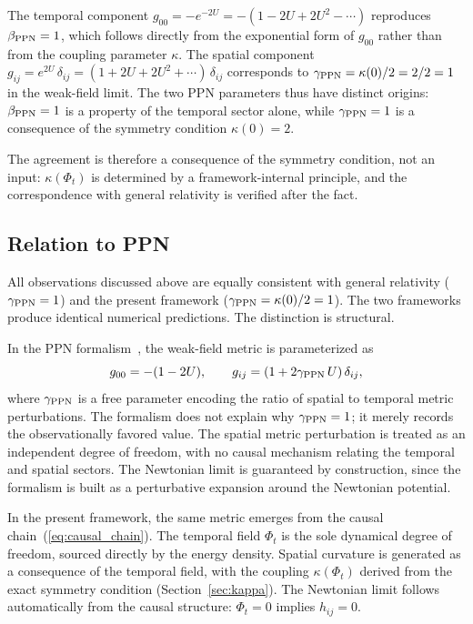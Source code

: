 \documentclass[12pt]{article}
\begin{document}
The temporal component $g_{00} = -e^{-2U} = -(1-2U+2U^2-\cdots)$ reproduces $\beta_{\rm PPN} = 1$, which follows directly from the exponential form of $g_{00}$ rather than from the coupling parameter $\kappa$. The spatial component $g_{ij} = e^{2U}\,\delta_{ij} = (1+2U+2U^2+\cdots)\,\delta_{ij}$ corresponds to $\gamma_{\rm PPN} = \kappa(0)/2 = 2/2 = 1$ in the weak-field limit. The two PPN parameters thus have distinct origins: $\beta_{\rm PPN} = 1$ is a property of the temporal sector alone, while $\gamma_{\rm PPN} = 1$ is a consequence of the symmetry condition $\kappa(0) = 2$.

The agreement is therefore a consequence of the symmetry condition, not an input: $\kappa(\Phi_t)$ is determined by a framework-internal principle, and the correspondence with general relativity is verified after the fact.

\subsection{Relation to PPN}
\label{sec:ppn_comparison}

All observations discussed above are equally consistent with general relativity ($\gamma_{\rm PPN} = 1$) and the present framework ($\gamma_{\rm PPN} = \kappa(0)/2 = 1$). The two frameworks produce identical numerical predictions. The distinction is structural.

In the PPN formalism~\cite{Will2014}, the weak-field metric is parameterized as
$$
g_{00} = -(1 - 2U), \qquad g_{ij} = (1 + 2\gamma_{\rm PPN}\,U)\,\delta_{ij},
$$
where $\gamma_{\rm PPN}$ is a free parameter encoding the ratio of spatial to temporal metric perturbations. The formalism does not explain why $\gamma_{\rm PPN} = 1$; it merely records the observationally favored value. The spatial metric perturbation is treated as an independent degree of freedom, with no causal mechanism relating the temporal and spatial sectors. The Newtonian limit is guaranteed by construction, since the formalism is built as a perturbative expansion around the Newtonian potential.

In the present framework, the same metric emerges from the causal chain~(\ref{eq:causal_chain}). The temporal field $\Phi_t$ is the sole dynamical degree of freedom, sourced directly by the energy density. Spatial curvature is generated as a consequence of the temporal field, with the coupling $\kappa(\Phi_t)$ derived from the exact symmetry condition (Section~\ref{sec:kappa}). The Newtonian limit follows automatically from the causal structure: $\Phi_t = 0$ implies $h_{ij} = 0$.
\end{document}
